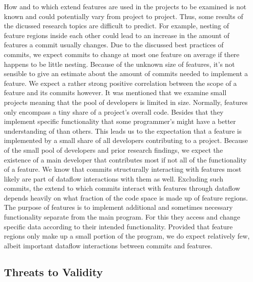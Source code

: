 How and to which extend features are used in the projects to be examined is not known and could potentially vary from project to project.
Thus, some results of the dicussed research topics are difficult to predict.
For example, nesting of feature regions inside each other could lead to an increase in the amount of features a commit usually changes.
Due to the discussed best practices of commits, we expect commits to change at most one feature on average if there happens to be little nesting.
Because of the unknown size of features, it's not sensible to give an estimate about the amount of commits needed to implement a feature.
We expect a rather strong positive correlation between the scope of a feature and its commits however.
It was mentioned that we examine small projects meaning that the pool of developers is limited in size. 
Normally, features only encompass a tiny share of a project's overall code. 
Besides that they implement specific functionality that some programmer's might have a better understanding of than others.
This leads us to the expectation that a feature is implemented by a small share of all developers contributing to a project.
Because of the small pool of developers and prior research findings, we expect the existence of a main developer that contributes most if not all of the functionality of a feature.
We know that commits structurally interacting with features most likely are part of dataflow interactions with them as well.
Excluding such commits, the extend to which commits interact with features through dataflow depends heavily on what fraction of the code space is made up of feature regions.
The purpose of features is to implement additional and sometimes necessary functionality separate from the main program.
For this they access and change specific data according to their intended functionality.
Provided that feature regions only make up a small portion of the program, we do expect relatively few, albeit important dataflow interactions between commits and features.

\subsection*{Threats to Validity}\label{sec:threats}

